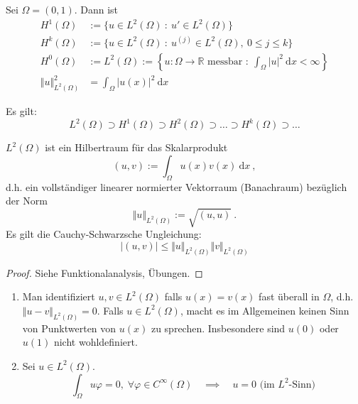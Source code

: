 \begin{defi}
    Sei $\Omega = (0,1)$. Dann ist
    \begin{align*}
        H^1(\Omega) &:= \{ u \in L^2(\Omega) \ : \ u' \in L^2(\Omega) \} \\
        H^k(\Omega) &:= \{ u \in L^2(\Omega) \ : \ u^{(j)} \in L^2(\Omega), \ 0 \leq j \leq k \} \\
        H^0(\Omega) &:= L^2(\Omega) := \left\{ u: \Omega \to \mathbb R \text{ messbar } : \ \int_\Omega |u|^2 \ \mathrm dx < \infty \right\} \\
        \Vert u \Vert_{L^2(\Omega)}^2 &= \int_\Omega | u(x) |^2 \ \mathrm dx
    \end{align*}
\end{defi}

\begin{bem}
    Es gilt:
    \[
        L^2(\Omega) \supset H^1(\Omega) \supset H^2(\Omega) \supset \ldots \supset H^k(\Omega) \supset \ldots
    \]
\end{bem}

\begin{satz}
    $L^2(\Omega)$ ist ein Hilbertraum für das Skalarprodukt
    \[
        (u, v) := \int_\Omega u(x) v(x) \ \mathrm dx \ ,
    \]
    d.h. ein vollständiger linearer normierter Vektorraum (Banachraum) bezüglich der Norm
    \[
        \Vert u \Vert_{L^2(\Omega)} := \sqrt{ (u, u) } \ .
    \]
    Es gilt die Cauchy-Schwarzsche Ungleichung:
    \[
        | (u,v) | \leq \Vert u \Vert_{L^2(\Omega)} \Vert v \Vert_{L^2(\Omega)}
    \]
\end{satz}
\begin{proof}
Siehe Funktionalanalysis, Übungen.
\end{proof}

\begin{bem}
    \begin{enumerate}
        \item Man identifiziert $u, v \in L^2(\Omega)$ falls $u(x) = v(x)$ fast überall in $\Omega$, d.h.
            $\Vert u - v \Vert_{L^2(\Omega)} = 0$.
            Falls $u \in L^2(\Omega)$, macht es im Allgemeinen keinen Sinn von Punktwerten von $u(x)$ zu sprechen.
            Insbesondere sind $u(0)$ oder $u(1)$ nicht wohldefiniert.
        \item Sei $u \in L^2(\Omega)$.
            \[
                \int_\Omega u \varphi = 0, \; \forall \varphi \in C^\infty(\Omega) \quad \implies \quad u = 0 \text{ (im $L^2$-Sinn)}
            \]
    \end{enumerate}
\end{bem}

